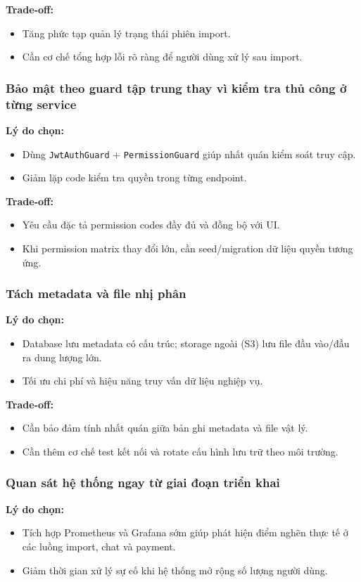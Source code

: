 \textbf{Trade-off:}
\begin{itemize}
	\item Tăng phức tạp quản lý trạng thái phiên import.
	\item Cần cơ chế tổng hợp lỗi rõ ràng để người dùng xử lý sau import.
\end{itemize}

\subsubsection{Bảo mật theo guard tập trung thay vì kiểm tra thủ công ở từng service}
\textbf{Lý do chọn:}
\begin{itemize}
	\item Dùng \texttt{JwtAuthGuard} + \texttt{PermissionGuard} giúp nhất quán kiểm soát truy cập.
	\item Giảm lặp code kiểm tra quyền trong từng endpoint.
\end{itemize}

\textbf{Trade-off:}
\begin{itemize}
	\item Yêu cầu đặc tả permission codes đầy đủ và đồng bộ với UI.
	\item Khi permission matrix thay đổi lớn, cần seed/migration dữ liệu quyền tương ứng.
\end{itemize}

\subsubsection{Tách metadata và file nhị phân}
\textbf{Lý do chọn:}
\begin{itemize}
	\item Database lưu metadata có cấu trúc; storage ngoài (S3) lưu file đầu vào/đầu ra dung lượng lớn.
	\item Tối ưu chi phí và hiệu năng truy vấn dữ liệu nghiệp vụ.
\end{itemize}

\textbf{Trade-off:}
\begin{itemize}
	\item Cần bảo đảm tính nhất quán giữa bản ghi metadata và file vật lý.
	\item Cần thêm cơ chế test kết nối và rotate cấu hình lưu trữ theo môi trường.
\end{itemize}

\subsubsection{Quan sát hệ thống ngay từ giai đoạn triển khai}
\textbf{Lý do chọn:}
\begin{itemize}
	\item Tích hợp Prometheus và Grafana sớm giúp phát hiện điểm nghẽn thực tế ở các luồng import, chat và payment.
	\item Giảm thời gian xử lý sự cố khi hệ thống mở rộng số lượng người dùng.
\end{itemize}

